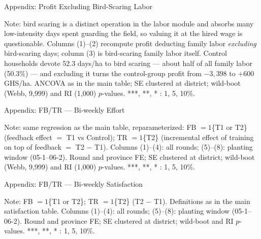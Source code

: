 \documentclass[aspectratio=169]{beamer}
\newcommand{\notefont}{\fontsize{5pt}{6pt}\selectfont}
\begin{document}
\begin{frame}{Appendix: Profit Excluding Bird-Scaring Labor}
	\centering
	\begin{minipage}{0.94\textwidth}
		\notefont
		Note: bird scaring is a distinct operation in the labor module and absorbs many
		low-intensity days spent guarding the field, so valuing it at the hired wage is
		questionable. Columns (1)--(2) recompute profit deducting family labor
		\emph{excluding} bird-scaring days; column (3) is bird-scaring family labor itself.
		Control households devote 52.3 days/ha to bird scaring --- about half of all family
		labor (50.3\%) --- and excluding it turns the control-group profit from $-3{,}398$ to
		$+600$ GHS/ha. ANCOVA as in the main table; SE clustered at district; wild-boot
		(Webb, 9{,}999) and RI (1{,}000) $p$-values. ***, **, * : 1, 5, 10\%.
	\end{minipage}
\end{frame}



\begin{frame}{Appendix: FB/TR --- Bi-weekly Effort}
	\centering
	\begin{minipage}{0.94\textwidth}
		\notefont
		Note: same regression as the main table, reparameterized: FB $=1$\{T1 or T2\}
		(feedback effect $=$ T1 vs Control); TR $=1$\{T2\} (incremental effect of training on top
		of feedback $=$ T2 $-$ T1). Columns (1)--(4): all rounds; (5)--(8): planting window
		(05-1--06-2). Round and province FE; SE clustered at district; wild-boot (Webb, 9{,}999)
		and RI (1{,}000) $p$-values. ***, **, * : 1, 5, 10\%.
	\end{minipage}
\end{frame}

\begin{frame}{Appendix: FB/TR --- Bi-weekly Satisfaction}
	\centering
	\begin{minipage}{0.94\textwidth}
		\notefont
		Note: FB $=1$\{T1 or T2\}; TR $=1$\{T2\} (T2 $-$ T1). Definitions as in the main
		satisfaction table. Columns (1)--(4): all rounds; (5)--(8): planting window (05-1--06-2).
		Round and province FE; SE clustered at district; wild-boot and RI $p$-values.
		***, **, * : 1, 5, 10\%.
	\end{minipage}
\end{frame}
\end{document}
